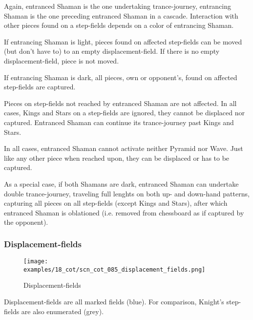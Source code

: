 Again, entranced Shaman is the one undertaking trance-journey, entrancing Shaman
is the one preceding entranced Shaman in a cascade. Interaction with other pieces
found on a step-fields depends on a color of entrancing Shaman.

If entrancing Shaman is light, pieces found on affected step-fields can be moved
(but don't have to) to an empty displacement-field. If there is no empty
displacement-field, piece is not moved.

If entrancing Shaman is dark, all pieces, own or opponent's, found on affected
step-fields are captured.

Pieces on step-fields not reached by entranced Shaman are not affected. In all
cases, Kings and Stars on a step-fields are ignored, they cannot be displaced
nor captured. Entranced Shaman can continue its trance-journey past Kings and Stars.

In all cases, entranced Shaman cannot activate neither Pyramid nor Wave. Just like
any other piece when reached upon, they can be displaced or has to be captured.

As a special case, if both Shamans are dark, entranced Shaman can undertake double
trance-journey, traveling full lenghts on both up- and down-hand patterns, capturing
all pieces on all step-fields (except Kings and Stars), after which entranced Shaman
is oblationed (i.e. removed from chessboard as if captured by the opponent).

\clearpage %

\subsubsection*{Displacement-fields}
\label{sec:Conquest of Tlalocan/Trance-journey/Interactions/Displacement-fields}

\vspace*{-1.5\baselineskip}
\noindent
\begin{figure}[!h]
\texttt{[image: examples/18\_cot/scn\_cot\_085\_displacement\_fields.png]}
\caption{Displacement-fields}
\label{fig:scn_cot_085_displacement_fields}
\end{figure}

Displacement-fields are all marked fields (blue). For comparison, Knight's
step-fields are also enumerated (grey).

